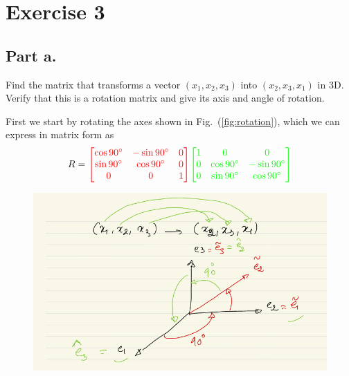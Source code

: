 \section{Exercise 3}
\subsection{Part a.}
Find the matrix that transforms a vector $(x_{1}, x_{2}, x_{3})$ into 
$(x_{2}, x_{3}, x_{1})$ in 3D. Verify that this is a rotation matrix and
give its axis and angle of rotation.
\begin{mdframed}[style=MyFrame]
    First we start by rotating the axes shown in Fig.~(\ref{fig:rotation}),
    which we can express in  matrix form as
    \begin{equation}
        R = 
        {\color{red}
        \begin{bmatrix}
            \cos 90^{\circ}     &   -\sin 90^{\circ}    &   0   \\
            \sin 90^{\circ}     &   \cos 90^{\circ}     &   0   \\
            0                   &   0                   &   1
        \end{bmatrix}
        }
        {\color{green}
        \begin{bmatrix}
            1                   &   0                   &   0                   \\
            0                   &   \cos 90^{\circ}     &   -\sin 90^{\circ}    \\
            0                   &   \sin 90^{\circ}     &   \cos 90^{\circ}     \\
        \end{bmatrix}
        }
    \end{equation}
    \begin{figure}[H]
        \includegraphics[height=0.35\textheight]{media/rotation.png}

\end{figure}
\end{mdframed}
